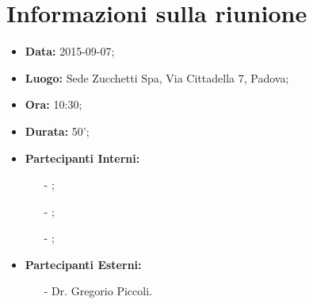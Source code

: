 \section{Informazioni sulla riunione}
\begin{itemize}
	\item \textbf{Data:} 2015-09-07;
	\item \textbf{Luogo:} Sede Zucchetti Spa, Via Cittadella 7, Padova;
	\item \textbf{Ora:} 10:30;
	\item \textbf{Durata:} 50';
	\item \textbf{Partecipanti Interni:}
	\begin{itemize}
		\item[-] \CoMa;
		\item[-] \GoIs;
		\item[-] \ReAn;
	\end{itemize}
	\item \textbf{Partecipanti Esterni:}
	\begin{itemize}
    	\item[-] Dr. Gregorio Piccoli.
    \end{itemize}
\end{itemize}